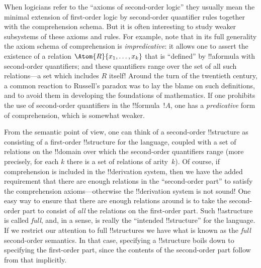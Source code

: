 \documentclass[../../../include/open-logic-section]{subfiles}
\begin{document}
When logicians refer to the ``axioms of second-order logic'' they
usually mean the minimal extension of first-order logic by
second-order quantifier rules together with the comprehension
schema. But it is often interesting to study weaker subsystems of
these axioms and rules. For example, note that in its full generality
the axiom schema of comprehension is \emph{impredicative}: it allows
one to assert the existence of a relation $\Atom{R}{x_1, \dots, x_k}$
that is ``defined'' by !!a{formula} with second-order quantifiers; and
these quantifiers range over the set of all such relations---a set
which includes $R$ itself!{} Around the turn of the twentieth century, a
common reaction to Russell's paradox was to lay the blame on such
definitions, and to avoid them in developing the foundations of
mathematics. If one prohibits the use of second-order quantifiers in
the !!{formula}~$!A$, one has a {\em predicative} form of
comprehension, which is somewhat weaker.

From the semantic point of view, one can think of a second-order
!!{structure} as consisting of a first-order !!{structure} for the
language, coupled with a set of relations on the !!{domain} over which
the second-order quantifiers range (more precisely, for each $k$ there
is a set of relations of arity~$k$). Of course, if comprehension is
included in the !!{derivation} system, then we have the added requirement that
there are enough relations in the ``second-order part'' to satisfy the
comprehension axioms---otherwise the !!{derivation} system is not sound!{} One
easy way to ensure that there are enough relations around is to take
the second-order part to consist of \emph{all} the relations on the
first-order part. Such !!a{structure} is called \emph{full}, and, in a
sense, is really the ``intended !!{structure}'' for the language. If
we restrict our attention to full !!{structure}s we have what is known
as the \emph{full} second-order semantics. In that case, specifying a
!!{structure} boils down to specifying the first-order part, since the
contents of the second-order part follow from that implicitly.
\end{document}
